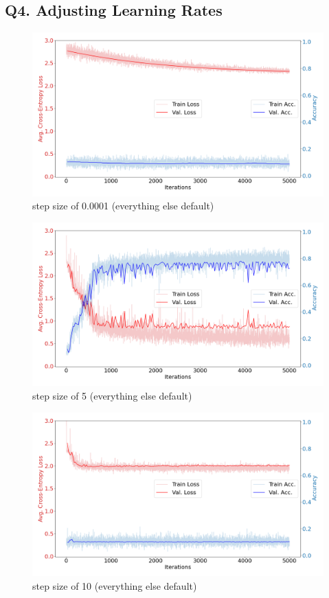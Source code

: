 \documentclass{article}
\begin{document}
\subsection*{Q4. Adjusting Learning Rates}
\begin{figure}[H]
    \includegraphics[scale = 0.4]{step.0001.png} 
    \caption{step size of 0.0001 (everything else default)}
\end{figure}
\begin{figure}[H]
    \includegraphics[scale = 0.4]{step5.png} 
    \caption{step size of 5 (everything else default)}
\end{figure}
\begin{figure}[H]
    \includegraphics[scale = 0.4]{step10.png} 
    \caption{step size of 10 (everything else default)}
\end{figure}
\end{document}
